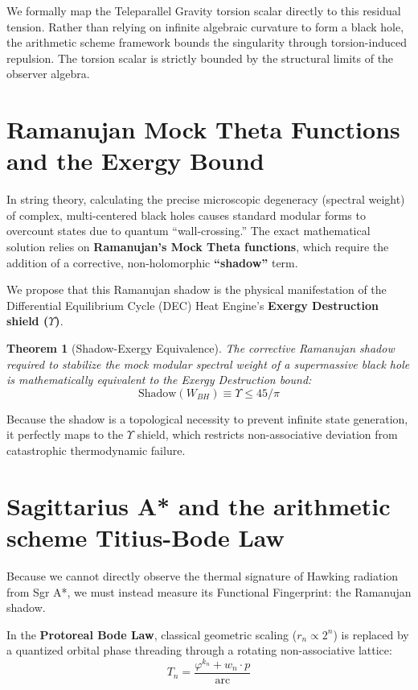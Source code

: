 \documentclass[11pt,a4paper]{article}
\newtheorem{theorem}{Theorem}
\begin{document}
We formally map the Teleparallel Gravity torsion scalar directly to this residual tension. Rather than relying on infinite algebraic curvature to form a black hole, the arithmetic scheme framework bounds the singularity through torsion-induced repulsion. The torsion scalar is strictly bounded by the structural limits of the observer algebra.

\section{Ramanujan Mock Theta Functions and the Exergy Bound}
In string theory, calculating the precise microscopic degeneracy (spectral weight) of complex, multi-centered black holes causes standard modular forms to overcount states due to quantum ``wall-crossing.'' The exact mathematical solution relies on \textbf{Ramanujan's Mock Theta functions}, which require the addition of a corrective, non-holomorphic \textbf{``shadow''} term.

We propose that this Ramanujan shadow is the physical manifestation of the Differential Equilibrium Cycle (DEC) Heat Engine's \textbf{Exergy Destruction shield ($\Upsilon$)}. 

\begin{theorem}[Shadow-Exergy Equivalence]
The corrective Ramanujan shadow required to stabilize the mock modular spectral weight of a supermassive black hole is mathematically equivalent to the Exergy Destruction bound:
$$ \text{Shadow}(W_{BH}) \equiv \Upsilon \leq 45/\pi $$
\end{theorem}

Because the shadow is a topological necessity to prevent infinite state generation, it perfectly maps to the $\Upsilon$ shield, which restricts non-associative deviation from catastrophic thermodynamic failure.

\section{Sagittarius A* and the arithmetic scheme Titius-Bode Law}
Because we cannot directly observe the thermal signature of Hawking radiation from Sgr A*, we must instead measure its Functional Fingerprint: the Ramanujan shadow.

In the \textbf{Protoreal Bode Law}, classical geometric scaling ($r_n \propto 2^n$) is replaced by a quantized orbital phase threading through a rotating non-associative lattice:
$$ T_n = \frac{\varphi^{k_n} + w_n \cdot p}{\text{arc}} $$
\end{document}

